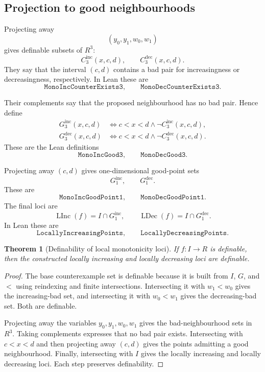 \documentclass[11pt]{article}
\newtheorem{theorem}[definition]{Theorem}
\newcommand{\LInc}{\operatorname{LInc}}
\newcommand{\LDec}{\operatorname{LDec}}
\newcommand{\Lean}[1]{\texttt{#1}}
\begin{document}
\subsection{Projection to good neighbourhoods}

Projecting away
\[
  (y_0,y_1,w_0,w_1)
\]
gives definable subsets of $R^3$:
\[
  C^{\mathrm{inc}}_3(x,c,d),
  \qquad
  C^{\mathrm{dec}}_3(x,c,d).
\]
They say that the interval $(c,d)$ contains a bad pair for increasingness or decreasingness,
respectively.  In Lean these are
\[
  \Lean{MonoIncCounterExists3},
  \qquad
  \Lean{MonoDecCounterExists3}.
\]

Their complements say that the proposed neighbourhood has no bad pair.  Hence define
\[
\begin{aligned}
  G^{\mathrm{inc}}_3(x,c,d)
  &\Longleftrightarrow
  c<x<d
  \land
  \neg C^{\mathrm{inc}}_3(x,c,d),\\
  G^{\mathrm{dec}}_3(x,c,d)
  &\Longleftrightarrow
  c<x<d
  \land
  \neg C^{\mathrm{dec}}_3(x,c,d).
\end{aligned}
\]
These are the Lean definitions
\[
  \Lean{MonoIncGood3},
  \qquad
  \Lean{MonoDecGood3}.
\]

Projecting away $(c,d)$ gives one-dimensional good-point sets
\[
  G^{\mathrm{inc}}_1,
  \qquad
  G^{\mathrm{dec}}_1.
\]
These are
\[
  \Lean{MonoIncGoodPoint1},
  \qquad
  \Lean{MonoDecGoodPoint1}.
\]
The final loci are
\[
  \LInc(f)=I\cap G^{\mathrm{inc}}_1,
  \qquad
  \LDec(f)=I\cap G^{\mathrm{dec}}_1.
\]
In Lean these are
\[
  \Lean{LocallyIncreasingPoints},
  \qquad
  \Lean{LocallyDecreasingPoints}.
\]

\begin{theorem}[Definability of local monotonicity loci]
If $f:I\to R$ is definable, then the constructed locally increasing and locally decreasing loci are
definable.
\end{theorem}

\begin{proof}
The base counterexample set is definable because it is built from $I$, $G$, and $<$ using reindexing
and finite intersections.  Intersecting it with $w_1<w_0$ gives the increasing-bad set, and
intersecting it with $w_0<w_1$ gives the decreasing-bad set.  Both are definable.

Projecting away the variables $y_0,y_1,w_0,w_1$ gives the bad-neighbourhood sets in $R^3$.  Taking
complements expresses that no bad pair exists.  Intersecting with $c<x<d$ and then projecting away
$(c,d)$ gives the points admitting a good neighbourhood.  Finally, intersecting with $I$ gives the
locally increasing and locally decreasing loci.  Each step preserves definability.
\end{proof}
\end{document}
